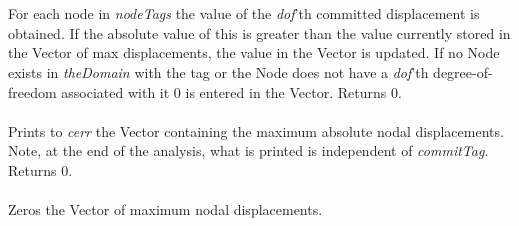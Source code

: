  \\
\\
For each node in {\em nodeTags} the value of the {\em dof}'th committed
displacement is obtained. If the absolute value of this is greater
than the value currently stored in the Vector of max displacements,
the value in the Vector is updated. If no Node exists in {\em
theDomain} with the tag or the Node does not have a {\em dof}'th
degree-of-freedom associated with it $0$ is entered in the
Vector. Returns $0$. \\

\\
Prints to {\em cerr} the Vector containing the maximum absolute nodal
displacements. Note, at the end of the analysis, what is printed is
independent of {\em commitTag}. Returns $0$. \\

\\ 
Zeros the Vector of maximum nodal displacements.